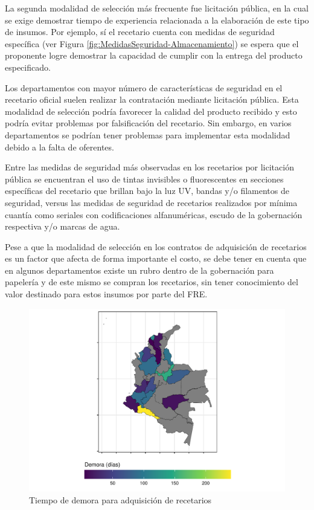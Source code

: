 \documentclass[
]{book}
\begin{document}
La segunda modalidad de selección más frecuente fue licitación pública, en la cual se exige demostrar tiempo de experiencia relacionada a la elaboración de este tipo de insumos. Por ejemplo, sí el recetario cuenta con medidas de seguridad específica (ver Figura \ref{fig:MedidasSeguridad-Almacenamiento}) se espera que el proponente logre demostrar la capacidad de cumplir con la entrega del producto especificado.

Los departamentos con mayor número de características de seguridad en el recetario oficial suelen realizar la contratación mediante licitación pública. Esta modalidad de selección podría favorecer la calidad del producto recibido y esto podría evitar problemas por falsificación del recetario. Sin embargo, en varios departamentos se podrían tener problemas para implementar esta modalidad debido a la falta de oferentes.

Entre las medidas de seguridad más observadas en los recetarios por licitación pública se encuentran el uso de tintas invisibles o fluorescentes en secciones específicas del recetario que brillan bajo la luz UV, bandas y/o filamentos de seguridad, versus las medidas de seguridad de recetarios realizados por mínima cuantía como seriales con codificaciones alfanuméricas, escudo de la gobernación respectiva y/o marcas de agua.

Pese a que la modalidad de selección en los contratos de adquisición de recetarios es un factor que afecta de forma importante el costo, se debe tener en cuenta que en algunos departamentos existe un rubro dentro de la gobernación para papelería y de este mismo se compran los recetarios, sin tener conocimiento del valor destinado para estos insumos por parte del FRE.

\begin{figure}
\includegraphics[width=0.85\linewidth]{InformeFinal_files/figure-latex/tiempoDemoraAdquisicion-1} \caption{Tiempo de demora para adquisición de recetarios}\label{fig:tiempoDemoraAdquisicion}
\end{figure}
\end{document}
